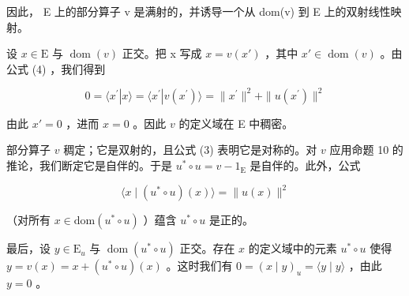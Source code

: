因此， E 上的部分算子 v 是满射的，并诱导一个从 dom(v) 到 E 上的双射线性映射。

设 \(x \in \mathrm{E}\) 与 \(\operatorname{dom}(v)\) 正交。把 x 写成 \(x = v(x')\) ，其中 \(x' \in \operatorname{dom}(v)\) 。由公式 (4) ，我们得到

\[
0 = \langle x ^ {\prime} | x \rangle = \langle x ^ {\prime} | v (x ^ {\prime}) \rangle = \| x ^ {\prime} \| ^ {2} + \| u (x ^ {\prime}) \| ^ {2}
\]

由此 \(x' = 0\) ，进而 \(x = 0\) 。因此 \(v\) 的定义域在 E 中稠密。

部分算子 \(v\) 稠定；它是双射的，且公式 (3) 表明它是对称的。对 \(v\) 应用命题 10 的推论，我们断定它是自伴的。于是 \(u^{*} \circ u = v - 1_{\mathrm{E}}\) 是自伴的。此外，公式

\[
\langle x \mid (u ^ {*} \circ u) (x) \rangle = \| u (x) \| ^ {2}
\]

（对所有 \(x \in \text{dom}(u^{*} \circ u)\) ）蕴含 \(u^{*} \circ u\) 是正的。

最后，设 \(y \in \mathrm{E}_u\) 与 \(\operatorname{dom}(u^* \circ u)\) 正交。存在 \(x\) 的定义域中的元素 \(u^* \circ u\) 使得 \(y = v(x) = x + (u^* \circ u)(x)\) 。这时我们有 \(0 = (x \mid y)_u = \langle y \mid y \rangle\) ，由此 \(y = 0\) 。

